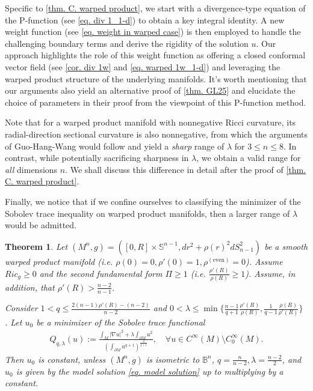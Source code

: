 \documentclass[12pt]{amsart}%
\newtheorem{theorem}{Theorem}
\numberwithin{equation}{section}
\numberwithin{lemma}{section}
\numberwithin{proposition}{section}
\numberwithin{corollary}{section}
\numberwithin{remark}{section}
\begin{document}
Specific to \cref{thm. C. warped product}, we start with a divergence-type equation of the P-function (see \cref{eq. div 1_1-d}) to obtain a key integral identity. A new weight function (see \cref{eq. weight in warped case}) is then employed to handle the challenging boundary terms and derive the rigidity of the solution $u$.
Our approach highlights the role of  this weight function as offering a closed conformal vector field (see \cref{cor. div 1w} and \cref{eq. warped 1w_1-d}) and leveraging the warped product structure of the underlying manifolds. 
It's worth mentioning that our arguments also yield an alternative proof of \cref{thm. GL25} and elucidate the choice of parameters in their proof from the viewpoint of this P-function method.

Note that for a warped product manifold with nonnegative Ricci curvature, its radial-direction sectional curvature is also nonnegative, from which the arguments of Guo-Hang-Wang \cite{GHW21} would follow and yield a \emph{sharp} range of $\lambda$ for $3\leq n\leq 8$. In contrast, while potentially sacrificing sharpness in $\lambda$, we obtain a valid range for \emph{all} dimensions $n$. We shall discuss this difference in detail after the proof of \cref{thm. C. warped product}.

Finally, we notice that if we confine ourselves to classifying the minimizer of the  Sobolev trace inequality on warped product manifolds, then a larger range of $\lambda$ would be admitted.
\begin{theorem}\label{thm.C. minimizer}
        Let $(M^n,g)
        =([0,R]\times \mathbb{S}^{n-1},dr^2+\rho(r)^2dS_{n-1}^2)$ be a smooth warped product manifold (i.e. $\rho(0)=0,\rho'(0)=1, \rho^{(\text{even})}=0$). Assume $Ric_g\geq 0$ and the second fundamental form $\Pi\geq 1$ (i.e. $\frac{\rho'(R)}{\rho(R)}\geq 1$). Assume, in addition, that $\rho'(R)>\frac{n-2}{n-1}$.
        
         Consider $1<q\leq \frac{2(n-1)\rho'(R)-(n-2)}{n-2}$ and $0<\lambda\leq 
         \min\{\frac{n-1}{q+1}\frac{\rho'(R)}{\rho(R)}, \frac{1}{q-1}\frac{\rho(R)}{\rho'(R)} \}$ . Let $u_0$ be a minimizer of the Sobolev trace functional 
           \begin{align*}
               Q_{q,\lambda}(u):=\frac{\int_{M}
               |\nabla u|^2
               +\lambda \int_{\partial M} u^2 }{(\int_{\partial M}u^{q+1})^{\frac{2}{q+1}}},\quad 
               \forall u\in C^{\infty}(M)\setminus C_0^{\infty}(M).
           \end{align*}
           Then $u_0$ is constant, 
           unless $(M^n,g)$ is isometric to $\mathbb{B}^n$, 
           $q=\frac{n}{n-2}, \lambda=\frac{n-2}{2}$, 
           and $u_0$ is given by the model solution \cref{eq. model solution}
           up to multiplying by a constant.
    \end{theorem}
\end{document}
